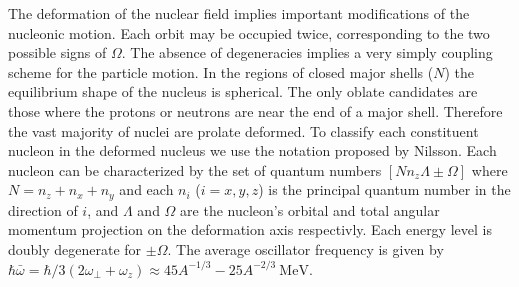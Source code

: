 \documentclass[10pt,a4paper, twoside, openright]{report}
\begin{document}
The deformation of the nuclear field implies important modifications of the nucleonic motion. Each orbit may be occupied twice, corresponding to the two possible signs of $\Omega$. The absence of degeneracies implies a very simply coupling scheme for the particle motion. In the regions of closed major shells ($N$) the equilibrium shape of the nucleus is spherical. The only oblate candidates are those where the protons or neutrons are near the end of a major shell. Therefore the vast majority of nuclei are prolate deformed. To classify each constituent nucleon in the deformed nucleus we use the notation proposed by Nilsson\cite{Nilsson1955, BohrMottVol2}. Each nucleon can be characterized by the set of quantum numbers $\left[N n_z \Lambda \pm\Omega\right]$ \cite{BohrMottVol2}  where $N = n_z + n_x + n_y$ and each $n_i$ ($i = x, y, z$) is the principal quantum number in the direction of $i$, and $\Lambda$ and $\Omega$ are the nucleon's orbital and total angular momentum projection on the deformation axis respectivly. Each energy level is doubly degenerate for $\pm\Omega$. The average oscillator frequency is given by $\hbar\bar{\omega} = \hbar/3\left(2\omega_{\perp} + \omega_z\right) \approx 45A^{-1/3} - 25A^{-2/3} \ \text{MeV}$\cite{Brown2016}. 
\end{document}
